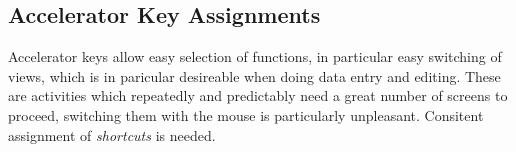 \subsection{Accelerator Key Assignments}
\label{sec:keys}

Accelerator keys allow easy selection of functions, in particular easy
switching of views, which is in paricular desireable when doing data
entry and editing. These are activities which repeatedly and
predictably need a great number of screens to proceed, switching them
with the mouse is particularly unpleasant. 
Consitent assignment of \textit{shortcuts} is needed.



